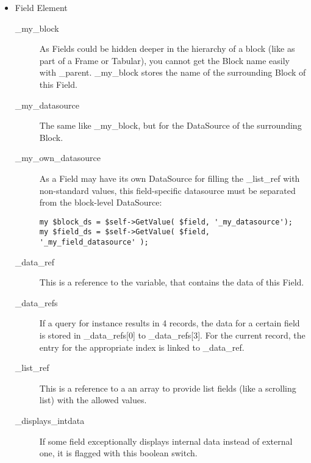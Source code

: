 \documentclass[a4paper,11pt]{scrartcl}
\begin{document}
\begin{itemize}
   \item Field Element
      \begin{description}
         \item[\_my\_block]
            As Fields could be hidden deeper in the hierarchy of a block
            (like as part of a Frame or Tabular), you cannot get the Block
            name easily with \_parent. \_my\_block stores the name of the
            surrounding Block of this Field.
         \item[\_my\_datasource]
            The same like \_my\_block, but for the DataSource of the
            surrounding Block.
         \item[\_my\_own\_datasource]
            As a Field may have its own DataSource for filling the
            \_list\_ref with non-standard values, this field-specific
            datasource must be separated from the block-level DataSource:

            \verb+my $block_ds = $self->GetValue( $field, '_my_datasource');+ \\
            \verb+my $field_ds = $self->GetValue( $field, '_my_field_datasource' );+

         \item[\_data\_ref]
            This is a reference to the variable, that contains the data of
            this Field.
         \item[\_data\_refs]
            If a query for instance results in 4 records, the data for a
            certain field is stored in \_data\_refs[0] to \_data\_refs[3].
            For the current record, the entry for the appropriate index is
            linked to \_data\_ref.
         \item[\_list\_ref]
            This is a reference to a an array to provide list fields (like a
            scrolling list) with the allowed values.
         \item[\_displays\_intdata]
            If some field exceptionally displays internal data instead of
            external one, it is flagged with this boolean switch.

      \end{description}

\end{itemize}
\end{document}

